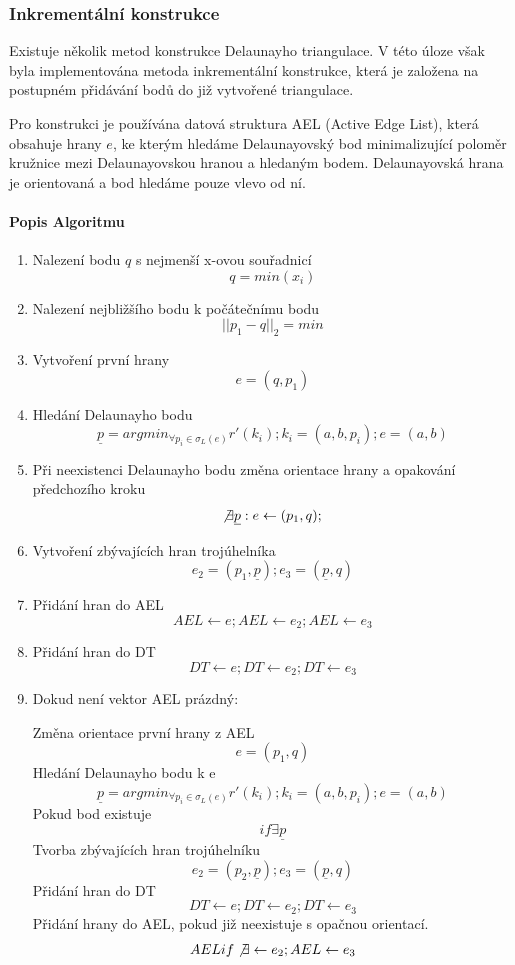 \documentclass[11pt]{article}
\begin{document}
\subsubsection{Inkrementální konstrukce}
Existuje několik metod konstrukce Delaunayho triangulace. V této úloze však byla implementována metoda inkrementální konstrukce, která je založena na postupném přidávání bodů do již vytvořené triangulace.

Pro konstrukci je používána datová struktura AEL (Active Edge List), která obsahuje hrany $e$, ke kterým hledáme Delaunayovský bod minimalizující poloměr kružnice mezi Delaunayovskou hranou a hledaným bodem. Delaunayovská hrana je orientovaná a bod hledáme pouze vlevo od ní.

 \paragraph{Popis Algoritmu}
 
 \begin{enumerate}
 \item Nalezení bodu $q$ s nejmenší x-ovou souřadnicí $$ q = min(x_i) $$ 
 \item Nalezení nejbližšího bodu k počátečnímu bodu $$ ||p_1 - q||_2 = min  $$
 \item Vytvoření první hrany $$ e = (q, p_1) $$
 \item Hledání Delaunayho bodu $$ \underline{p} = argmin_{\forall p_i \in \sigma_L (e)} r'(k_i); k_i = (a, b, p_i); e = (a, b)$$
 \item Při neexistenci Delaunayho bodu změna orientace hrany a opakování předchozího kroku $$ \not\exists \underline{p} : e \leftarrow (p_1, q);$$ 
 \item Vytvoření zbývajících hran trojúhelníka  $$ e_2 = (p_1,  \underline{p}); e_3 = ( \underline{p} , q) $$
 \item Přidání hran do AEL  $$ AEL \leftarrow e; AEL \leftarrow e_2; AEL \leftarrow e_3  $$  
 \item Přidání hran do DT   $$ DT \leftarrow e; DT \leftarrow e_2; DT \leftarrow e_3  $$
 \item Dokud není vektor AEL prázdný: 
 
		Změna orientace první hrany z AEL $$ e = (p_1, q) $$
		Hledání Delaunayho bodu k e  $$ \underline{p} = argmin_{\forall p_i \in \sigma_L (e)} r'(k_i); k_i = (a, b, p_i); e = (a, b)$$ 
		Pokud bod existuje $$ if \exists  \underline{p}$$
		Tvorba zbývajících hran trojúhelníku $$ e_2 = (p_2,  \underline{p}); e_3 = ( \underline{p} , q) $$
		Přidání hran do DT $$ DT \leftarrow e; DT \leftarrow e_2; DT \leftarrow e_3  $$
		Přidání hrany do AEL, pokud již neexistuje s opačnou orientací.$$AEL if \not\exists \leftarrow e_2; AEL \leftarrow e_3  $$ 
 \end{enumerate}
\end{document}

